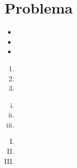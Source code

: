 \chapter{Problema}
\lipsum[11-15]
\begin{itemize}
\item \lipsum[1][1]
\item \lipsum[1][2]
\item \lipsum[1][3]
\end{itemize}

\lipsum[16-17]
\begin{enumerate}
\item \lipsum[2][1]
\item \lipsum[2][2]
\item \lipsum[2][3]
\end{enumerate}

\lipsum[18]
\begin{enumerate}[i)]
\item \lipsum[3][1]
\item \lipsum[3][2]
\item \lipsum[3][3]
\end{enumerate}

\lipsum[19-22]
\begin{enumerate}[(I)]
\item \lipsum[4][1]
\item \lipsum[4][2]
\item \lipsum[4][3]
\end{enumerate}